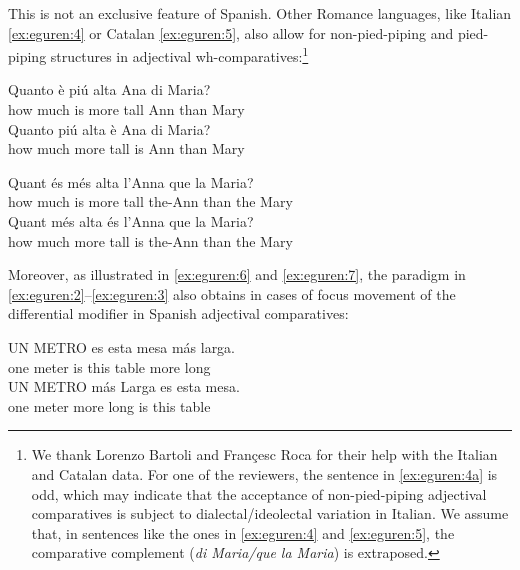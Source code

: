 \documentclass[output=paper,colorlinks,citecolor=brown]{langscibook}
\begin{document}
This is not an exclusive feature of Spanish. Other Romance languages, like Italian \ref{ex:eguren:4} or Catalan \ref{ex:eguren:5}, also allow for non-pied-piping and pied-piping structures in adjectival wh-comparatives:\footnote{We thank Lorenzo Bartoli and Françesc Roca for their help with the Italian and Catalan data. For one of the reviewers, the sentence in \ref{ex:eguren:4a} is odd, which may indicate that the acceptance of non-pied-piping adjectival comparatives is subject to dialectal/ideolectal variation in Italian. We assume that, in sentences like the ones in \ref{ex:eguren:4} and \ref{ex:eguren:5}, the comparative complement (\textit{di Maria/que la Maria}) is extraposed.}


\begin{exe} 
    \ex\label{ex:eguren:4} 
    \begin{xlist}
            \ex\label{ex:eguren:4a}
\gll 	Quanto 		è	piú	alta	Ana	di		Maria?\\
        {how much}	is	more	tall	Ann	than	Mary\\
            \ex\label{ex:eguren:4b}
\gll 	Quanto		piú	alta	è	Ana	di		Maria?\\
        {how much}	more	tall	is	Ann	than	Mary\\
    \end{xlist}
\end{exe}

\begin{exe} 
    \ex\label{ex:eguren:5} 
    \begin{xlist}
            \ex\label{ex:eguren:5a}
\gll   Quant és	més	alta	l’Anna		que	la Maria?\\
       {how much}	is	more	tall	the-Ann		than	the Mary\\
            \ex\label{ex:eguren:5b}
\gll Quant		més	alta	és	l’Anna	que	la Maria?\\
     {how much}	more	tall	is	the-Ann	than	the Mary\\
    \end{xlist}
\end{exe}

Moreover, as illustrated in \ref{ex:eguren:6} and \ref{ex:eguren:7}, the paradigm in \ref{ex:eguren:2}--\ref{ex:eguren:3} also obtains in cases of focus movement of the differential modifier in Spanish adjectival comparatives:

\begin{exe} 
    \ex\label{ex:eguren:6} 
    \begin{xlist}
            \ex
\gll UN METRO es	esta	mesa	más	larga.\\
      	one	meter			is	this	table	more	long\\
            \ex
\gll UN	METRO	más	Larga	es	esta	mesa.\\
      one	meter		more	long		is	this	table\\
    \end{xlist}
\end{exe}
\end{document}
